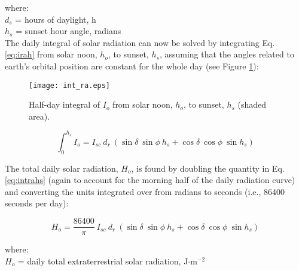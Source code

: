 \noindent where:\\
\indent $d_s$ = hours of daylight, h \\
\indent $h_s$ = sunset hour angle, radians \\ 

The daily integral of solar radiation can now be solved by integrating Eq. \ref{eq:irah} from solar noon, $h_o$, to sunset, $h_s$, assuming that the angles related to earth's orbital position are constant for the whole day (see Figure \ref{fig:intra}):

\begin{figure}[ht!]
    \texttt{[image: int\_ra.eps]}
    \caption{Half-day integral of $I_o$ from solar noon, $h_o$, to sunset, $h_s$ (shaded area).}
    \label{fig:intra}
\end{figure}

\begin{equation}
\label{eq:intrahs}
	\int_0^{h_s} I_o = I_{sc}\: d_r\: \left( 
	      \sin\delta\: \sin\phi\: h_s + 
	      \cos\delta\: \cos\phi\: \sin h_s \right)
\end{equation}

\noindent The total daily solar radiation, $H_o$, is found by doubling the quantity in Eq. \ref{eq:intrahs} (again to account for the morning half of the daily radiation curve) and converting the units integrated over from radians to seconds (i.e., 86400 seconds per day):

\begin{equation}
\label{eq:dayra}
	H_o = \frac{86400}{\pi}\: I_{sc}\: d_r\: \left( 
	      \sin\delta\: \sin\phi\: h_s + 
	      \cos\delta\: \cos\phi\: \sin h_s \right)
\end{equation}

\noindent where: \\
\indent $H_o$ = daily total extraterrestrial solar radiation, J$\cdot$m$^{-2}$\\

